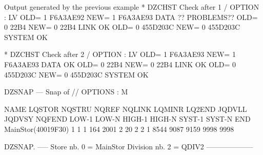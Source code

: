 \begin{Listing}{Output generated by the previous example}
* DZCHST Check after 1       / OPTION : LV    OLD=   1         F6A3AE92    NEW=   1         F6A3AE93        DATA    ?? PROBLEMS??
                                              OLD=   0             22B4    NEW=   0             22B4        LINK       OK        
                                              OLD=   0         455D203C    NEW=   0         455D203C        SYSTEM     OK        
                                                                                                                                 
* DZCHST Check after 2       / OPTION : LV    OLD=   1         F6A3AE93    NEW=   1         F6A3AE93        DATA       OK        
                                              OLD=   0             22B4    NEW=   0             22B4        LINK       OK        
                                              OLD=   0         455D203C    NEW=   0         455D203C        SYSTEM     OK        
                                                                                                                                 
DZSNAP --- Snap of //                                                                              OPTIONS : M                   
                                                                                                                                 
  NAME       LQSTOR NQSTRU  NQREF NQLINK LQMINR LQ2END JQDVLL JQDVSY NQFEND  LOW-1  LOW-N HIGH-1 HIGH-N SYST-1 SYST-N    END     
 MainStor(40019F30)      1      1      1    164   2001      2     20      2      2      1   8544   9087   9159   9998   9998     
                                                                                                                                 
DZSNAP.   -----  Store nb. 0 = MainStor Division nb. 2 = QDIV2                       --------------------                        
                                                                                                                                 

\end{Listing}
